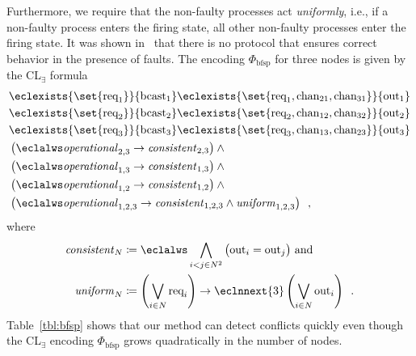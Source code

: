 \documentclass{LMCS}
\newcommand{\consistent}{\mathit{consistent}}
\newcommand{\operational}{\mathit{operational}}
\newcommand{\uniform}{\mathit{uniform}}
\theoremstyle{plain}\newtheorem{theorem}[thm]{Theorem}
\theoremstyle{plain}\newtheorem{lemma}[thm]{Lemma}
\theoremstyle{plain}\newtheorem{proposition}[thm]{Proposition}
\theoremstyle{plain}\newtheorem{corollary}[thm]{Corollary}
\theoremstyle{definition}\newtheorem{definition}{Definition}[section]
\begin{document}
Furthermore, we require that the non-faulty processes act \emph{uniformly}, i.e., if a non-faulty process enters the firing state, all other non-faulty processes enter the firing state.
It was shown in~\cite{DBLP:conf/podc/FischerLM85} that there is no protocol that ensures correct behavior in the presence of faults.
The encoding $\Phi_\text{bfsp}$ for three nodes is given by the CL$_\exists$ formula
\begin{align} \label{eq:byzantine_firing_squad}
  &\eclexists{\set{\text{req}_1}}{\text{bcast}_1} \eclexists{\set{\text{req}_1, \text{chan}_{21}, \text{chan}_{31}}}{\text{out}_1} \nonumber\\
  &\eclexists{\set{\text{req}_2}}{\text{bcast}_2} \eclexists{\set{\text{req}_2, \text{chan}_{12}, \text{chan}_{32}}}{\text{out}_{2}} \nonumber\\
  &\eclexists{\set{\text{req}_3}}{\text{bcast}_3} \eclexists{\set{\text{req}_3, \text{chan}_{13}, \text{chan}_{23}}}{\text{out}_{3}} \nonumber\\
  & \left( \eclalws  \operational_{2,3}  \rightarrow \consistent_{2,3} \right) \land {} \nonumber\\
  & \left( \eclalws  \operational_{1,3}  \rightarrow \consistent_{1,3} \right) \land {} \nonumber\\
  & \left( \eclalws  \operational_{1,2}  \rightarrow \consistent_{1,2} \right) \land {} \nonumber\\
  & \left( \eclalws  \operational_{1,2,3}  \rightarrow \consistent_{1,2,3} \land \uniform_{1,2,3} \right) \enspace,
\end{align}\noindent
where
\begin{align}
  \consistent_N &{} \coloneqq \eclalws \bigwedge_{i<j \in N^2} \big( \text{out}_i = \text{out}_j \big) \text{ and} \nonumber \\
  \uniform_N &{} \coloneqq \left( \bigvee_{i \in N} \text{req}_i \right) \rightarrow \eclnnext{3} \left( \bigvee_{i \in N} \text{out}_i \right) \enspace. \label{eq:bfsp_fixed_uniform}
\end{align}
Table~\ref{tbl:bfsp} shows that our method can detect conflicts quickly even though the CL$_\exists$ encoding $\Phi_\text{bfsp}$ grows quadratically in the number of nodes.
\end{document}

